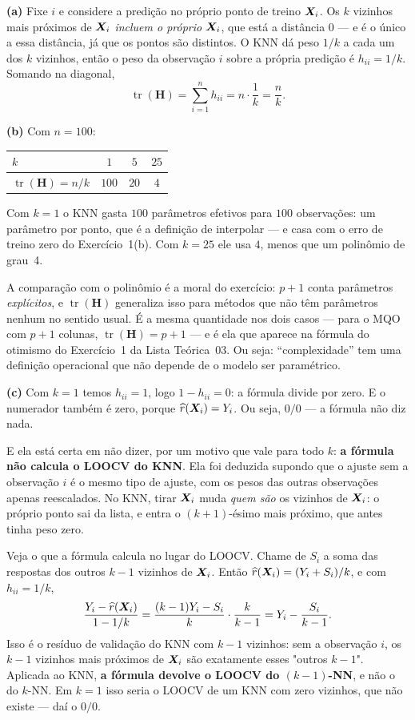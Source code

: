 \documentclass[11pt,a4paper]{article}
\begin{document}
\begin{solucao}
\textbf{(a)} Fixe $i$ e considere a predição no próprio ponto de treino $\bm{X}_i$. Os
$k$ vizinhos mais próximos de $\bm{X}_i$ \emph{incluem o próprio $\bm{X}_i$}, que está a
distância $0$ --- e é o único a essa distância, já que os pontos são distintos. O
KNN dá peso $1/k$ a cada um dos $k$ vizinhos, então o peso da observação $i$ sobre
a própria predição é $h_{ii}=1/k$. Somando na diagonal,
\[
  \operatorname{tr}(\bm H)=\sum_{i=1}^n h_{ii}=n\cdot\frac1k=\frac nk .
\]

\smallskip
\textbf{(b)} Com $n=100$:
\begin{center}\small
\begin{tabular}{@{}lccc@{}}
\toprule
$k$ & $1$ & $5$ & $25$ \\
\midrule
$\operatorname{tr}(\bm H)=n/k$ & $100$ & $20$ & $4$ \\
\bottomrule
\end{tabular}
\end{center}
Com $k=1$ o KNN gasta $100$ parâmetros efetivos para $100$ observações: um
parâmetro por ponto, que é a definição de interpolar --- e casa com o erro de
treino zero do Exercício~1(b). Com $k=25$ ele usa $4$, menos que um polinômio de
grau~4.

A comparação com o polinômio é a moral do exercício: $p+1$ conta parâmetros
\emph{explícitos}, e $\operatorname{tr}(\bm H)$ generaliza isso para métodos que
não têm parâmetros nenhum no sentido usual. É a mesma quantidade nos dois casos
--- para o MQO com $p+1$ colunas, $\operatorname{tr}(\bm H)=p+1$ --- e é ela que
aparece na fórmula do otimismo do Exercício~1 da Lista Teórica~03. Ou seja:
``complexidade'' tem uma definição operacional que não depende de o modelo ser
paramétrico.

\smallskip
\textbf{(c)} Com $k=1$ temos $h_{ii}=1$, logo $1-h_{ii}=0$: a fórmula divide por
zero. E o numerador também é zero, porque $\widehat{r}(\bm{X}_i)=Y_i$. Ou seja, $0/0$ --- a
fórmula não diz nada.

E ela está certa em não dizer, por um motivo que vale para todo $k$: \textbf{a
fórmula não calcula o LOOCV do KNN}. Ela foi deduzida supondo que o ajuste sem a
observação $i$ é o mesmo tipo de ajuste, com os pesos das outras observações apenas
reescalados. No KNN, tirar $\bm{X}_i$ muda \emph{quem são} os vizinhos de $\bm{X}_i$: o próprio
ponto sai da lista, e entra o $(k+1)$-ésimo mais próximo, que antes tinha peso zero.

Veja o que a fórmula calcula no lugar do LOOCV. Chame de $S_i$ a soma das respostas
dos outros $k-1$ vizinhos de $\bm{X}_i$. Então $\widehat{r}(\bm{X}_i)=(Y_i+S_i)/k$, e com
$h_{ii}=1/k$,
\[
  \frac{Y_i-\widehat{r}(\bm{X}_i)}{1-1/k}
  =\frac{(k-1)Y_i-S_i}{k}\cdot\frac{k}{k-1}
  =Y_i-\frac{S_i}{k-1}.
\]
Isso é o resíduo de validação do KNN com $k-1$ vizinhos: sem a observação $i$, os
$k-1$ vizinhos mais próximos de $\bm{X}_i$ são exatamente esses "outros $k-1$". Aplicada ao
KNN, \textbf{a fórmula devolve o LOOCV do $(k-1)$-NN}, e não o do $k$-NN. Em $k=1$
isso seria o LOOCV de um KNN com zero vizinhos, que não existe --- daí o $0/0$.


\end{solucao}
\end{document}
